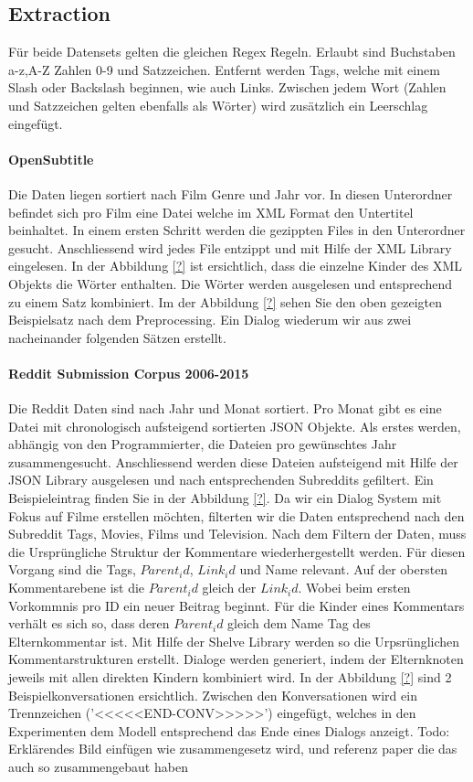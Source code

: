 \subsection{Extraction}
Für beide Datensets gelten die gleichen Regex Regeln. Erlaubt sind Buchstaben a-z,A-Z Zahlen 0-9 und Satzzeichen. Entfernt werden Tags, welche mit einem Slash oder Backslash beginnen, wie auch Links. Zwischen jedem Wort (Zahlen und Satzzeichen gelten ebenfalls als Wörter) wird zusätzlich ein Leerschlag eingefügt.
\paragraph{OpenSubtitle} Die Daten liegen sortiert nach Film Genre und Jahr vor. In diesen Unterordner befindet sich pro Film eine Datei welche im XML Format den Untertitel beinhaltet.
In einem ersten Schritt werden die gezippten Files in den Unterordner gesucht. Anschliessend wird jedes File entzippt und mit Hilfe der XML Library eingelesen. In der Abbildung \ref{?} ist ersichtlich, dass die einzelne Kinder des XML Objekts die Wörter enthalten. Die Wörter werden ausgelesen und entsprechend zu einem Satz kombiniert. Im der Abbildung \ref{?} sehen Sie den oben gezeigten Beispielsatz nach dem Preprocessing. Ein Dialog wiederum wir aus zwei nacheinander folgenden Sätzen erstellt.
\paragraph{Reddit Submission Corpus 2006-2015} Die Reddit Daten sind nach Jahr und Monat sortiert. Pro Monat gibt es eine Datei mit chronologisch aufsteigend sortierten JSON Objekte.
Als erstes werden, abhängig von den Programmierter, die Dateien pro gewünschtes Jahr zusammengesucht. Anschliessend werden diese Dateien aufsteigend mit Hilfe der JSON Library ausgelesen und nach entsprechenden Subreddits gefiltert. Ein Beispieleintrag finden Sie in der Abbildung \ref{?}. Da wir ein Dialog System mit Fokus auf Filme erstellen möchten, filterten wir die Daten entsprechend nach den Subreddit Tags, Movies, Films und Television. Nach dem Filtern der Daten, muss die Ursprüngliche Struktur der Kommentare wiederhergestellt werden. Für diesen Vorgang sind die Tags, $Parent_id$, $Link_id$ und Name relevant. Auf der obersten Kommentarebene ist die $Parent_id$ gleich der $Link_id$. Wobei beim ersten Vorkommnis pro ID ein neuer Beitrag beginnt. Für die Kinder eines Kommentars verhält es sich so, dass deren $Parent_id$ gleich dem Name Tag des Elternkommentar ist. Mit Hilfe der Shelve Library werden so die Urpsrünglichen Kommentarstrukturen erstellt. Dialoge werden generiert, indem der Elternknoten jeweils mit allen direkten Kindern kombiniert wird. In der Abbildung \ref{?} sind 2 Beispielkonversationen ersichtlich. Zwischen den Konversationen wird ein Trennzeichen ('<<<<<END-CONV>>>>>') eingefügt, welches in den Experimenten dem Modell entsprechend das Ende eines Dialogs anzeigt.
Todo: Erklärendes Bild einfügen wie zusammengesetz wird, und referenz paper die das auch so zusammengebaut haben

